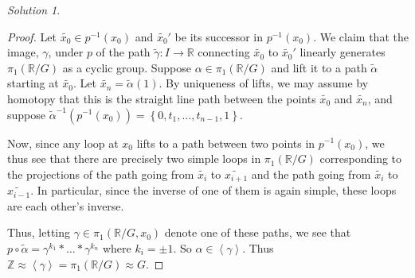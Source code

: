 \documentclass[reqno]{amsart}
\theoremstyle{definition}
\theoremstyle{remark}
\newtheorem*{solution}{Solution}
\begin{document}
\begin{solution}
\begin{proof}
            Let $\tilde{x_0} \in p^{-1}(x_0)$ and
            $\tilde{x_0}'$ be its successor in
            $p^{-1}(x_0)$. We claim that the image, $\gamma$,
            under $p$ of the
            path $\tilde{\gamma} \colon I \to \mathbb{R}$ connecting
            $\tilde{x_0}$ to $\tilde{x_0}'$ linearly
            generates $\pi_1 \left( \mathbb{R} /G \right) $ 
            as a cyclic group. Suppose
            $\alpha \in \pi_1 \left( \mathbb{R} /G \right) $ and
            lift it to a path $\tilde{\alpha}$ starting
            at $\tilde{x_0}$. Let
            $\tilde{x_n} = \tilde{\alpha}(1)$. By
            uniqueness of lifts, we may assume by homotopy
            that this is the straight line
            path between the points $\tilde{x_0}$ and
            $\tilde{x_n}$, and
            suppose
            $\tilde{\alpha}^{-1} \left( p^{-1}(x_0) \right)
            = \left\{ 0, t_1, \ldots, t_{n-1}, 1 \right\} $.
            
            Now, since any loop at $x_0$ lifts
            to a path between two points in
            $p^{-1}(x_0)$, we thus see that
            there are precisely two simple loops
            in $\pi_1 \left( \mathbb{R} /G \right) $ corresponding
            to the projections of the path going from
            $\tilde{x_i}$ to $\tilde{x_{i+1}}$ and
            the path going from $\tilde{x_{i}}$ to 
            $\tilde{x_{i-1}}$. In particular, since
            the inverse of one of them is again simple, these
            loops are each other's inverse. 


            Thus, letting $\gamma \in 
            \pi_1 \left( \mathbb{R} /G, x_0 \right) $ denote
            one of these paths, we see that
            $p \circ \tilde{\alpha}
            = \gamma^{k_1} * \ldots * \gamma^{k_n}$ where
            $k_i = \pm 1 $. So
            $\alpha \in  \left<\gamma  \right>$.
            Thus
            $\mathbb{Z} \approx \left<\gamma \right> =
            \pi_1 \left( \mathbb{R} / G \right) \approx
            G$.


        \end{proof}
        







    \end{solution}









\end{document}
